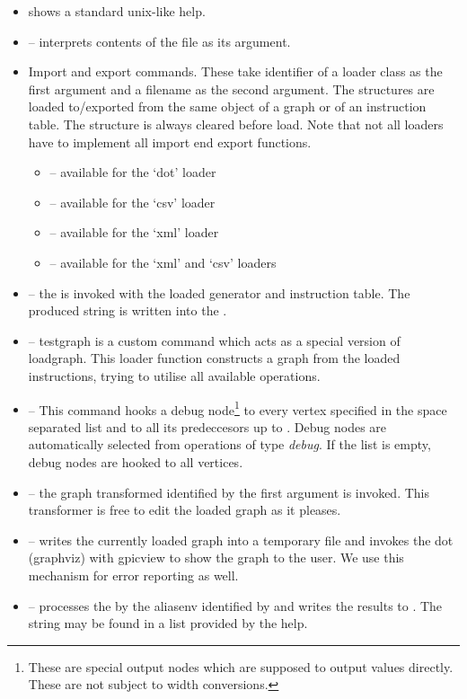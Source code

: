 \begin{itemize}
  \item {} shows a standard unix-like help.
  \item {} -- interprets contents of the file as its argument.
  \item Import and export commands. These take identifier of a loader class as the first argument and a filename as the second argument. The structures are loaded to/exported from the same object of a graph or of an instruction table. The structure is always cleared before load. Note that not all loaders have to implement all import end export functions. 
  \begin{itemize}
    \item {} -- available for the `dot' loader
    \item {} -- available for the `csv' loader
    \item {} -- available for the `xml' loader
    \item {} -- available for the `xml' and `csv' loaders
  \end{itemize}
  \item {} -- the  is invoked with the loaded generator and instruction table. The produced string is written into the .
  \item {} -- testgraph is a custom command which acts as a special version of loadgraph. This loader function constructs a graph from the loaded instructions, trying to utilise all available operations. 
  \item {} -- This command hooks a debug node\footnote{These are special output nodes which are supposed to output values directly. These are not subject to width conversions.} to every vertex specified in the space separated list and to all its predeccesors up to . Debug nodes are automatically selected from operations of type \emph{debug}. If the list is empty, debug nodes are hooked to all vertices.
  \item {} -- the graph transformed identified by the first argument is invoked. This transformer is free to edit the loaded graph as it pleases.
  \item {} -- writes the currently loaded graph into a temporary file and invokes the dot (graphviz) with gpicview to show the graph to the user. We use this mechanism for error reporting as well.
  \item {} -- processes the  by the aliasenv identified by  and writes the results to . The  string may be found in a list provided by the  help.
\end{itemize}

